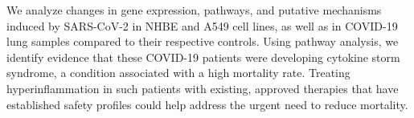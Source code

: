 \documentclass[Minh_PhD_thesis.tex]{subfiles}
\begin{document}
We analyze changes in gene expression, pathways, and putative mechanisms induced by SARS-CoV-2 in NHBE and A549 cell lines, as well as in COVID-19 lung samples compared to their respective controls. Using pathway analysis, we identify evidence that these COVID-19 patients were developing cytokine storm syndrome, a condition associated with a high mortality rate. Treating hyperinflammation in such patients with existing, approved therapies that have established safety profiles could help address the urgent need to reduce mortality.




\end{document}
